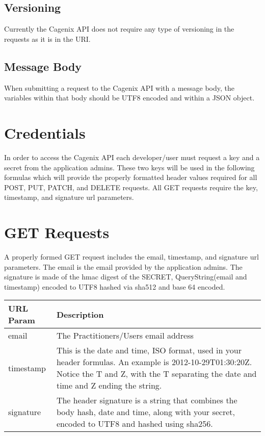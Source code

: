 \documentclass[letterpaper,10pt,english]{sphinxmanual}
\begin{document}
\subsection{Versioning}
\label{dev-api-overview:versioning}
Currently the Cagenix API does not require any type of versioning in the
requests as it is in the URI.


\subsection{Message Body}
\label{dev-api-overview:message-body}
When submitting a request to the Cagenix API with a message body, the
variables within that body should be UTF8 encoded and within a JSON object.


\section{Credentials}
\label{dev-api-overview:credentials}
In order to access the Cagenix API each developer/user must request a key and
a secret from the application admins. These two keys will be used in the
following formulas which will provide the properly formatted header values
required for all POST, PUT, PATCH, and DELETE requests. All GET requests require
the key, timestamp, and signature url parameters.


\section{GET Requests}
\label{dev-api-overview:get-requests}
A properly formed GET request includes the email, timestamp, and signature url
parameters. The email is the email provided by the application admins.  The
signature is made of the hmac digest of the SECRET, QueryString(email and timestamp) encoded to
UTF8 hashed via sha512 and base 64 encoded.

\begin{tabulary}{\linewidth}{|L|L|}
\hline
\textsf{\relax 
URL Param
} & \textsf{\relax 
Description
}\\
\hline
email
 & 
The Practitioners/Users email address
\\

timestamp
 & 
This is the date and time, ISO format, used in your
header formulas. An example is 2012-10-29T01:30:20Z.
Notice the T and Z, with the T separating the date and
time and Z ending the string.
\\

signature
 & 
The header signature is a string that combines the body
hash, date and time, along with your secret, encoded to
UTF8 and hashed using sha256.
\\
\hline\end{tabulary}
\end{document}
